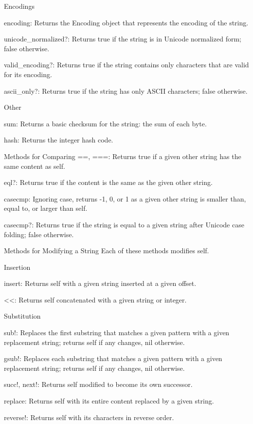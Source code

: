 Encodings

encoding: Returns the Encoding object that represents the encoding of the string.

unicode\_normalized?: Returns true if the string is in Unicode normalized form; false otherwise.

valid\_encoding?: Returns true if the string contains only characters that are valid for its encoding.

ascii\_only?: Returns true if the string has only ASCII characters; false otherwise.

Other

sum: Returns a basic checksum for the string: the sum of each byte.

hash: Returns the integer hash code.

Methods for Comparing
==, ===: Returns true if a given other string has the same content as self.

eql?: Returns true if the content is the same as the given other string.


casecmp: Ignoring case, returns -1, 0, or 1 as a given other string is smaller than, equal to, or larger than self.

casecmp?: Returns true if the string is equal to a given string after Unicode case folding; false otherwise.

Methods for Modifying a String
Each of these methods modifies self.

Insertion

insert: Returns self with a given string inserted at a given offset.

<<: Returns self concatenated with a given string or integer.

Substitution

sub!: Replaces the first substring that matches a given pattern with a given replacement string; returns self if any changes, nil otherwise.

gsub!: Replaces each substring that matches a given pattern with a given replacement string; returns self if any changes, nil otherwise.

succ!, next!: Returns self modified to become its own successor.

replace: Returns self with its entire content replaced by a given string.

reverse!: Returns self with its characters in reverse order.

